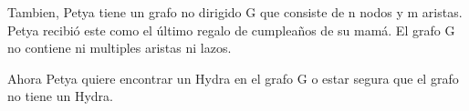 \documentclass{article}
\begin{document}
    \begin{flushleft}
        Tambien, Petya tiene un grafo no dirigido G que consiste de n nodos y m aristas. Petya recibi\'o este como el \'ultimo regalo de cumplea\~nos de su mam\'a. El grafo G no contiene ni multiples aristas ni lazos.
    \end{flushleft}
  
    \begin{flushleft}
        Ahora Petya quiere encontrar un Hydra en el grafo G o estar segura que el grafo no tiene un Hydra.
    \end{flushleft}
\end{document}
